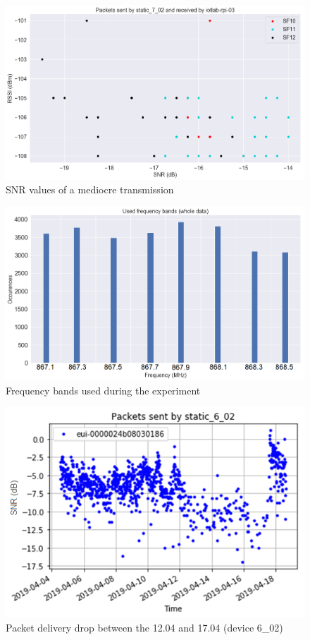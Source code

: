 \documentclass[letterpaper, 10 pt, conference]{ieeeconf}  %
\begin{document}
\begin{figure}[htbp]
\centering
\includegraphics[scale=0.22]{snr_limit.png}
\caption{SNR values of a mediocre transmission}
\label{snr_limit}
\end{figure}

\begin{figure}[htbp]
\centering
\includegraphics[scale=0.3]{freq_count.png}
\caption{Frequency bands used during the experiment}
\label{freq_count}
\end{figure}

\begin{figure}[htbp]
\centering
\includegraphics[scale=0.5]{6_02_freq_problem.png}
\caption{Packet delivery drop between the 12.04 and 17.04 (device 6\_02)}
\label{6_02_freq_problem}
\end{figure}
\end{document}
